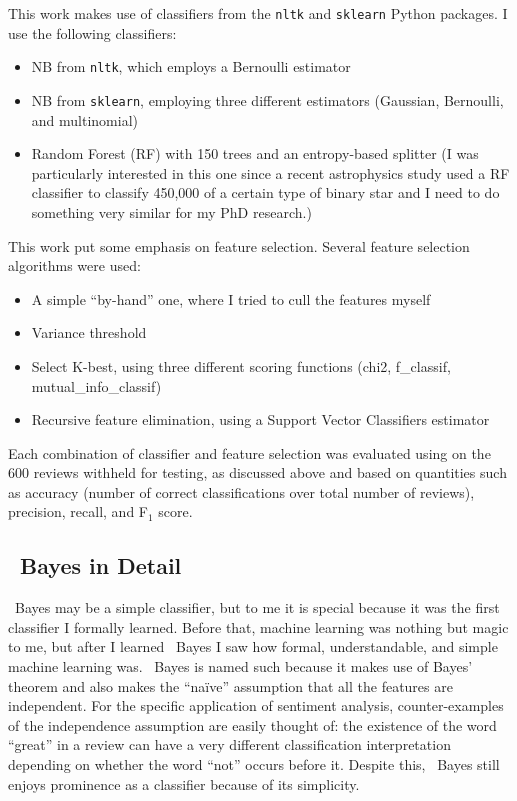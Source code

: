 This work makes use of classifiers from the \texttt{nltk} \cite{bird2009} and \texttt{sklearn} \cite{scikit-learn} Python packages.  I use  the following classifiers:
\begin{itemize}
\item NB from \texttt{nltk}, which employs a Bernoulli estimator
\item NB from \texttt{sklearn}, employing three different estimators (Gaussian, Bernoulli, and multinomial)
\item Random Forest (RF) with 150 trees and an entropy-based splitter
(I was particularly interested in this one since a recent astrophysics study \cite{ogle2017} used a RF classifier to classify 450,000 of a certain type of binary star and I need to do something very similar for my PhD research.)
\end{itemize}
This work put some emphasis on feature selection.  Several feature selection algorithms were used:
\begin{itemize}
\item A simple ``by-hand'' one, where I tried to cull the features myself
\item Variance threshold
\item Select K-best, using three different scoring functions (chi2, f\_classif, mutual\_info\_classif)
\item Recursive feature elimination, using a Support Vector Classifiers estimator
\end{itemize}
Each combination of classifier and feature selection was evaluated using on the 600 reviews withheld for testing, as discussed above and based on quantities such as accuracy (number of correct classifications over total number of reviews), precision, recall, and F$_1$ score.


\subsection{\Na\ Bayes in Detail}
\Na\ Bayes may be a simple classifier, but to me it is special because it was the first classifier I formally learned.  Before that, machine learning was nothing but magic to me, but after I learned \Na\ Bayes I saw how formal, understandable, and simple machine learning was.  \Na\ Bayes is named such because it makes use of Bayes' theorem and also makes the ``na\"ive'' assumption that all the features are independent.  For the specific application of sentiment analysis, counter-examples of the independence assumption are easily thought of: the existence of the word ``great'' in a review can have a very different classification interpretation depending on whether the word ``not'' occurs before it.  Despite this, \Na\ Bayes still enjoys prominence as a classifier because of its simplicity.

